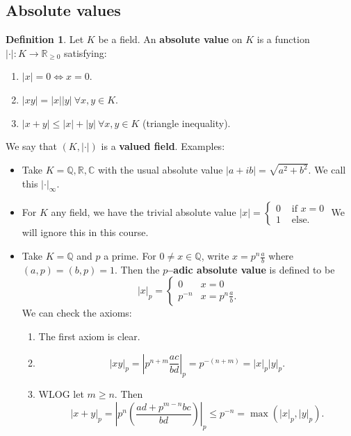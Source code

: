 \documentclass{article}
\theoremstyle{definition}
\newtheorem{defn}{Definition}[section]
\begin{document}
\subsection{Absolute values}
\begin{defn}
    Let $K$ be a field. An \textbf{absolute value} on $K$ is a function $|\cdot| : K \to \mathbb{R}_{\ge 0}$ satisfying:
    \begin{enumerate}[(1)]
        \item $|x| = 0 \iff x = 0$.
        \item $|xy| = |x||y| ~\forall x,y \in K$.
        \item $|x+y|\le |x|+|y| ~\forall x,y \in K$ (triangle inequality).
    \end{enumerate}
\end{defn}
We say that $(K, |\cdot|)$ is a \textbf{valued field}.
Examples:
\begin{itemize}
    \item Take $K=\mathbb{Q},\mathbb{R},\mathbb{C}$ with the usual absolute value $|a+ib| = \sqrt{a^2+b^2}$. We call this $|\cdot |_{\infty}$.
    \item For $K$ any field, we have the trivial absolute value $|x| = \begin{cases}
        0 & \text{ if } x = 0\\
        1 & \text{ else.}
    \end{cases}$
    We will ignore this in this course.
    \item Take $K= \mathbb{Q}$ and $p$ a prime. For $0 \neq x \in \mathbb{Q}$, write $x = p^n \frac{a}{b}$ where $(a,p)=(b,p)=1$. Then the \textbf{$p$--adic absolute value} is defined to be \[
    |x|_p = \begin{cases}
        0 & x=0\\
        p^{-n} & x = p^n\frac{a}{b}.
    \end{cases}
    \] 
    We can check the axioms:
    \begin{enumerate}[(1)]
        \item The first axiom is clear.
        \item $$|xy|_p = \left|p^{n+m}\frac{ac}{bd}\right|_p = p^{-(n+m)} = |x|_p|y|_p.$$
        \item WLOG let $m\ge n$. Then \[
        |x+y|_p = \left|p^n\left(\frac{ad+p^{m-n}bc}{bd}\right)\right|_p \le p^{-n} = \max(|x|_p, |y|_p).
        \]
    \end{enumerate}
\end{itemize}
\end{document}
